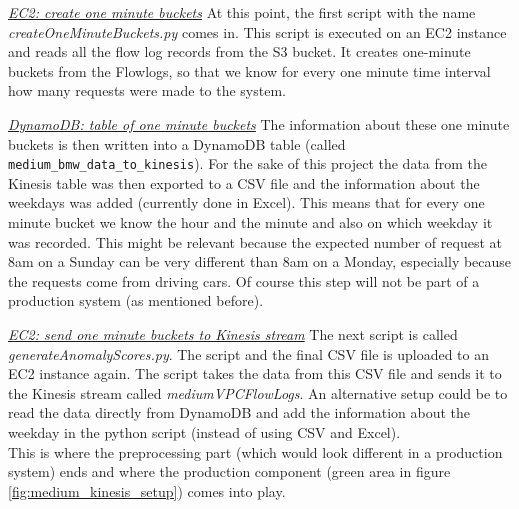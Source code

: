 \textit{\underline{EC2: create one minute buckets}}\break
At this point, the first script with the name \textit{createOneMinuteBuckets.py} comes in. This script is executed on an EC2 instance and reads all the flow log records from the S3 bucket. It creates one-minute buckets from the Flowlogs, so that we know for every one minute time interval how many requests were made to the system. 

\textit{\underline{DynamoDB: table of one minute buckets}}\break
The information about these one minute buckets is then written into a DynamoDB table (called \verb|medium_bmw_data_to_kinesis|). For the sake of this project the data from the Kinesis table was then exported to a CSV file and the information about the weekdays was added (currently done in Excel). This means that for every one minute bucket we know the hour and the minute and also on which weekday it was recorded. This might be relevant because the expected number of request at 8am on a Sunday can be very different than 8am on a Monday, especially because the requests come from driving cars.  Of course this step will not be part of a production system (as mentioned before).

\textit{\underline{EC2: send one minute buckets to Kinesis stream}}\break
The next script is called \textit{generateAnomalyScores.py}. The script and the final CSV file is uploaded to an EC2 instance again. The script takes the data from this CSV file and sends it to the Kinesis stream called \textit{medium\textunderscore VPCFlowLogs}. An alternative setup could be to read the data directly from DynamoDB and add the information about the weekday in the python script (instead of using CSV and Excel).\\
This is where the preprocessing part (which would look different in a production system) ends and where the production component (green area in figure \ref{fig:medium_kinesis_setup}) comes into play.\\

